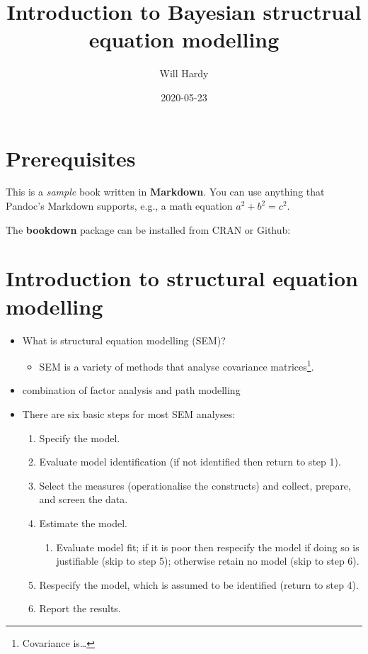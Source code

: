 \documentclass[]{book}
\title{Introduction to Bayesian structrual equation modelling}
\author{Will Hardy}
\date{2020-05-23}
\providecommand{\tightlist}{%
  \setlength{\itemsep}{0pt}\setlength{\parskip}{0pt}}
\begin{document}
\maketitle

{
\setcounter{tocdepth}{1}
\tableofcontents
}
\hypertarget{prerequisites}{%
\chapter{Prerequisites}\label{prerequisites}}

This is a \emph{sample} book written in \textbf{Markdown}. You can use anything that Pandoc's Markdown supports, e.g., a math equation \(a^2 + b^2 = c^2\).

The \textbf{bookdown} package can be installed from CRAN or Github:

\hypertarget{introduction-to-structural-equation-modelling}{%
\chapter{Introduction to structural equation modelling}\label{introduction-to-structural-equation-modelling}}

\begin{itemize}
\tightlist
\item
  What is structural equation modelling (SEM)?

  \begin{itemize}
  \tightlist
  \item
    SEM is a variety of methods that analyse covariance matrices\footnote{Covariance is\ldots{}}.
  \end{itemize}
\item
  combination of factor analysis and path modelling
\item
  There are six basic steps for most SEM analyses:

  \begin{enumerate}
  \def\labelenumi{\arabic{enumi}.}
  \tightlist
  \item
    Specify the model.
  \item
    Evaluate model identification (if not identified then return to step 1).
  \item
    Select the measures (operationalise the constructs) and collect, prepare, and screen the data.
  \item
    Estimate the model.

    \begin{enumerate}
    \def\labelenumii{\arabic{enumii}.}
    \tightlist
    \item
      Evaluate model fit; if it is poor then respecify the model if doing so is justifiable (skip to step 5); otherwise retain no model (skip to step 6).
    \end{enumerate}
  \item
    Respecify the model, which is assumed to be identified (return to step 4).
  \item
    Report the results.
  \end{enumerate}
\end{itemize}
\end{document}
